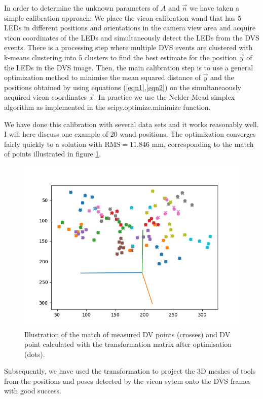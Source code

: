 \documentclass{article}
\begin{document}
In order to determine the unknown parameters of $A$ and $\vec{n}$ we have taken a simple calibration approach: We place the vicon calibration wand that has 5 LEDs in different positions and orientations in the camera view area and acquire vicon coordinates of the LEDs and simultaneously detect the LEDs from the DVS events. There is a processing step where multiple DVS events are clustered with k-means clustering into 5 clusters to find the best estimate for the position $\vec{y}$ of the LEDs in the DVS image. Then, the main calibration step is to use a general optimization method to minimise the mean squared distance of $\vec{y}$ and the positions obtained by using equations (\ref{eqn1},\ref{eqn2}) on the simultaneaously acquired vicon coordinates $\vec{x}$. In practice we use the Nelder-Mead simplex algorithm as implemented in the scipy.optimize.minimize function.

We have done this calibration with several data sets and it works reasonably well. I will here discuss one example of 20 wand positions. The optimization converges fairly quickly to a solution with RMS$= 11.846$ mm, corresponding to the match of points illustrated in figure \ref{figure1}.

\begin{figure}
  \includegraphics[width=\textwidth]{figure_match.png}
  \caption{\label{figure1} Illustration of the match of measured DV points (crosses) and DV point calculated with the transformation matrix after optimisation (dots).}
\end{figure}

Subsequently, we have used the transformation to project the 3D meshes of tools from the positions and poses detected by the vicon sytem onto the DVS frames with good success.
\end{document}
